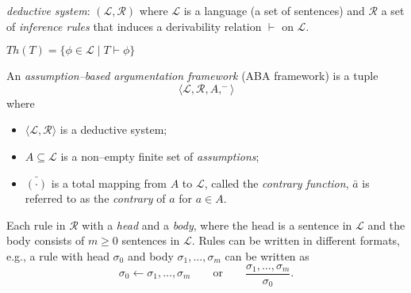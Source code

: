 \textit{deductive system}: 
$(\mathcal{L},\mathcal{R})$ where $\mathcal{L}$ is a language (a set of sentences) and $\mathcal{R}$ a set of \textit{inference rules} that induces a derivability relation $\vdash$ on $\mathcal{L}$.



$Th(T) = \{\phi \in \mathcal{L} \mid T \vdash \phi\}$


An \textit{assumption--based argumentation framework} (ABA framework) is a tuple 
\[
 \langle \mathcal{L}, \mathcal{R}, A, ^- \rangle
\] 
where 
\begin{itemize}[itemsep=5pt,parsep=5pt,leftmargin=3em,topsep=5pt]
    \item 
    $\langle \mathcal{L}, \mathcal{R} \rangle$ is a deductive system;

    \item 
    $A \subseteq \mathcal{L}$ is a non--empty finite set of \textit{assumptions}; 

    \item 
    $\bar{(\cdot)}$ is a total mapping from $A$ to $\mathcal{L}$, 
    called the \textit{contrary function}, 
    {\color{purple} $\bar{a}$} is referred to as the \textit{contrary} of $a$ for $a \in A$.
\end{itemize}



Each rule in $\mathcal{R}$ with a \textit{head} and a \textit{body}, 
where the head is a sentence in $\mathcal{L}$ and the body consists of $m \geq 0$ sentences in $\mathcal{L}$.
% 
Rules can be written in different formats, 
e.g., 
a rule with head $\sigma_0$ and body $\sigma_1, \ldots, \sigma_m$ can be written as 
\[
\sigma_0 \leftarrow \sigma_1, \ldots, \sigma_m 
\qquad \text{or} \qquad
\dfrac{\sigma_1, \dots,\sigma_m}{\sigma_0}.
\]





